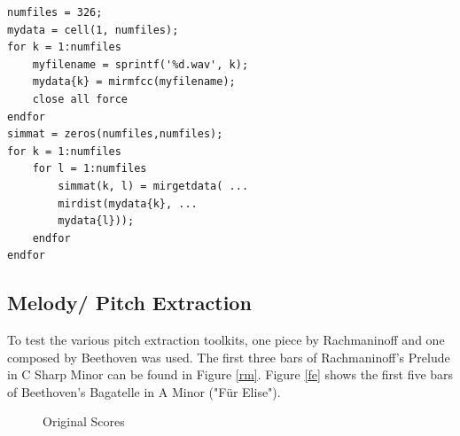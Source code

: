 \lstset{language=Matlab}          %
\FloatBarrier

\begin{lstlisting}[frame=single,label={lst:MIRmat},
caption={MIR Toolkit Similarity},captionpos=b]  % Start your code-block
numfiles = 326;
mydata = cell(1, numfiles);
for k = 1:numfiles
	myfilename = sprintf('%d.wav', k);
	mydata{k} = mirmfcc(myfilename);
	close all force
endfor
simmat = zeros(numfiles,numfiles);
for k = 1:numfiles
	for l = 1:numfiles
		simmat(k, l) = mirgetdata( ...
		mirdist(mydata{k}, ...
		mydata{l}));
	endfor
endfor
\end{lstlisting}
\FloatBarrier

\subsection{Melody/ Pitch Extraction}\label{midiest}
To test the various pitch extraction toolkits, one piece by Rachmaninoff and one composed by Beethoven was used. The first three bars of Rachmaninoff's Prelude in C Sharp Minor can be found in Figure \ref{rm}. Figure \ref{fe} shows the first five bars of Beethoven's Bagatelle in A Minor ("Für Elise").
\begin{figure}[htbp]
	\centering
	\caption{Original Scores}
	\label{fig:sheets}
\end{figure}
